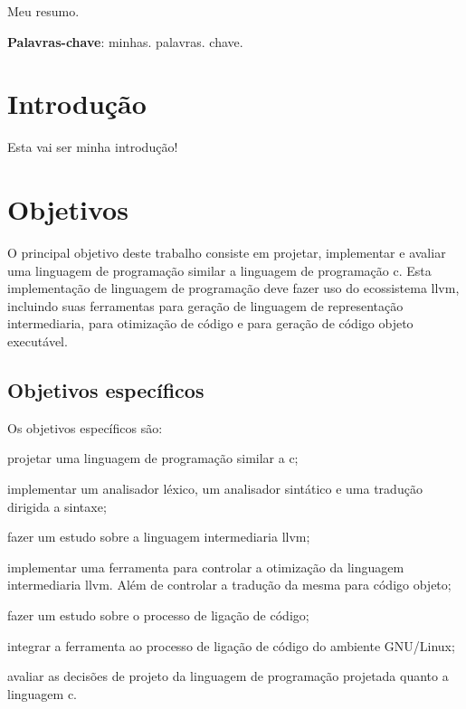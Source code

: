 \documentclass[
  12pt,
  openright,
  twoside,
  a4paper,
  english,
  brazil
]{abntex2}
\begin{document}
\pretextual{}
\imprimircapa{}
\imprimirfolhaderosto{}

\begin{folhadeaprovacao}
  
\end{folhadeaprovacao}

\begin{resumo}
Meu resumo.

\vspace{\onelineskip}
\noindent
\textbf{Palavras-chave}: minhas\@. palavras\@. chave.

\end{resumo}

\begin{KeepFromToc}
  \tableofcontents
\end{KeepFromToc}

\textual{}

\chapter{Introdução}\label{cap:introdução}

Esta vai ser minha introdução\cite{dijkstra1968}!

\chapter{Objetivos}\label{cap:objetivos}

O principal objetivo deste trabalho consiste em projetar, implementar e avaliar uma linguagem de programação similar a linguagem de programação c.
Esta implementação de linguagem de programação deve fazer uso do ecossistema llvm, incluindo suas ferramentas para geração de linguagem de representação intermediaria, para otimização de código e para geração de código objeto executável.

\section{Objetivos específicos}

Os objetivos específicos são:
\begin{alineas}
  \item projetar uma linguagem de programação similar a c;
  \item implementar um analisador léxico, um analisador sintático e uma tradução dirigida a sintaxe;
  \item fazer um estudo sobre a linguagem intermediaria llvm;
  \item implementar uma ferramenta para controlar a otimização da linguagem intermediaria llvm. Além de controlar a tradução da mesma para código objeto;
  \item fazer um estudo sobre o processo de ligação de código;
  \item integrar a ferramenta ao processo de ligação de código do ambiente GNU/Linux;
  \item avaliar as decisões de projeto da linguagem de programação projetada quanto a linguagem c.
\end{alineas}
\end{document}
